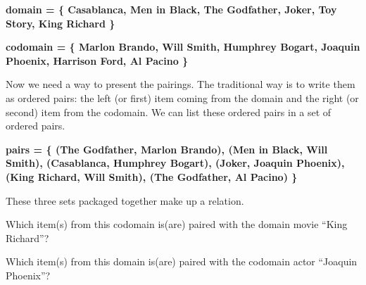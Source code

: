 \documentclass{ximera}
\begin{document}
\begin{center} 
\textbf{\textcolor{blue!75!black}{ domain = \{ Casablanca, Men in Black,  The Godfather, Joker, Toy Story, King Richard \} }}
\end{center}

\begin{center} 
\textbf{\textcolor{blue!75!black}{ codomain = \{ Marlon Brando, Will Smith, Humphrey Bogart, Joaquin Phoenix, Harrison Ford, Al Pacino \} }}
\end{center}

Now we need a way to present the pairings.  The traditional way is to write them as ordered pairs: the left (or first) item coming from the domain and the right (or second) item from the codomain.  We can list these ordered pairs in a set of ordered pairs. 

\begin{center} 
\textbf{\textcolor{blue!75!black}{ pairs = \{ (The Godfather, Marlon Brando), (Men in Black, Will Smith), (Casablanca, Humphrey Bogart), (Joker, Joaquin Phoenix), (King Richard, Will Smith), (The Godfather, Al Pacino) \}  }}
\end{center}


These three sets packaged together make up a relation. 



\begin{question}

Which item(s) from this codomain is(are) paired with the domain movie ``King Richard''?
\begin{selectAll}
\end{selectAll}

\end{question}



\begin{question}

Which item(s) from this domain is(are) paired with the codomain actor ``Joaquin Phoenix''?
\begin{selectAll}
\end{selectAll}

\end{question}
\end{document}
